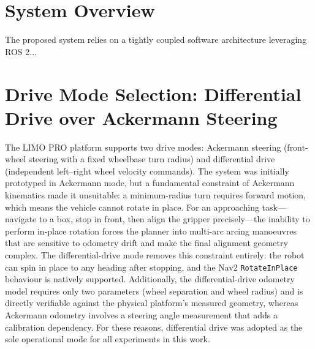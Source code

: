 
\section{System Overview}
The proposed system relies on a tightly coupled software architecture leveraging ROS 2...

\section{Drive Mode Selection: Differential Drive over Ackermann Steering}
The LIMO PRO platform supports two drive modes: Ackermann steering (front-wheel steering
with a fixed wheelbase turn radius) and differential drive (independent left--right wheel
velocity commands). The system was initially prototyped in Ackermann mode, but a
fundamental constraint of Ackermann kinematics made it unsuitable: a minimum-radius turn
requires forward motion, which means the vehicle cannot rotate in place. For an
approaching task---navigate to a box, stop in front, then align the gripper precisely---the
inability to perform in-place rotation forces the planner into multi-arc arcing manoeuvres
that are sensitive to odometry drift and make the final alignment geometry complex. The
differential-drive mode removes this constraint entirely: the robot can spin in place to
any heading after stopping, and the Nav2 \texttt{RotateInPlace} behaviour is natively
supported. Additionally, the differential-drive odometry model requires only two
parameters (wheel separation and wheel radius) and is directly verifiable against the
physical platform's measured geometry, whereas Ackermann odometry involves a steering
angle measurement that adds a calibration dependency. For these reasons, differential
drive was adopted as the sole operational mode for all experiments in this work.

